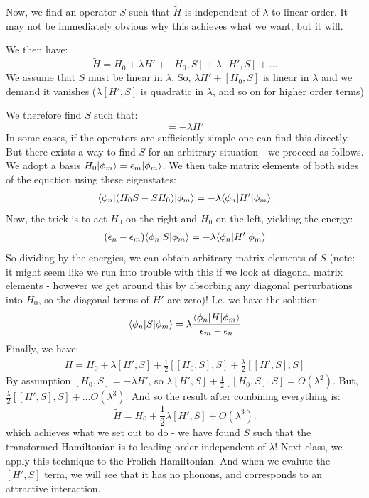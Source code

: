 Now, we find an operator $S$ such that $\tilde{H}$ is independent of $\lambda$ to linear order. It may not be immediately obvious why this achieves what we want, but it will.

We then have:
\begin{equation}
    \tilde{H} = H_0 + \lambda H' + [H_0, S] + \lambda[H', S] + \ldots 
\end{equation}
We assume that $S$ must be linear in $\lambda$. So, $\lambda H' + [H_0, S]$ is linear in $\lambda$ and we demand it vanishes ($\lambda[H', S]$ is quadratic in $\lambda$, and so on for higher order terms)

We therefore find $S$ such that:
\begin{equation}
    [H_0, S] = -\lambda H'
\end{equation}
In some cases, if the operators are sufficiently simple one can find this directly. But there exists a way to find $S$ for an arbitrary situation - we proceed as follows. We adopt a basis $H_0\lvert \phi_m \rangle = \epsilon_m\lvert \phi_m \rangle$. We then take matrix elements of both sides of the equation using these eigenstates:
\begin{align*}
    \langle \phi_n \rvert(H_0S - SH_0)\lvert \phi_m \rangle = -\lambda \langle \phi_n \rvert H'\lvert \phi_m \rangle
\end{align*}
Now, the trick is to act $H_0$ on the right and $H_0$ on the left, yielding the energy:
\begin{align*}
    (\epsilon_n - \epsilon_m)\langle \phi_n \rvert S\lvert \phi_m \rangle = -\lambda \langle \phi_n \rvert H'\lvert \phi_m \rangle
\end{align*}
So dividing by the energies, we can obtain arbitrary matrix elements of $S$ (note: it might seem like we run into trouble with this if we look at diagonal matrix elements - however we get around this by absorbing any diagonal perturbations into $H_0$, so the diagonal terms of $H'$ are zero)! I.e. we have the solution:
\begin{equation}\label{eq-Smatrixelements}
    \langle \phi_n \rvert S\lvert \phi_m \rangle = \lambda\frac{\langle \phi_n \rvert H\lvert \phi_m \rangle}{\epsilon_m - \epsilon_n}
\end{equation}
Finally, we have:
\begin{align*}
    \tilde{H} = H_0 + \lambda[H', S] + \frac{1}{2}[[H_0, S], S] + \frac{\lambda}{2}[[H', S], S]
\end{align*}
By assumption $[H_0, S] = -\lambda H'$, so $\lambda[H', S] + \frac{1}{2}[[H_0, S], S] = O(\lambda^2)$. But, $\frac{\lambda}{2}[[H', S], S] + \ldots O(\lambda^3)$. And so the result after combining everything is:
\begin{equation}
    \tilde{H} = H_0 + \frac{1}{2}\lambda [H',S] + O(\lambda^3).
\end{equation}
which achieves what we set out to do - we have found $S$ such that the transformed Hamiltonian is to leading order independent of $\lambda$! Next class, we apply this technique to the Frolich Hamiltonian. And when we evalute the $[H', S]$ term, we will see that it has no phonons, and corresponds to an attractive interaction.

